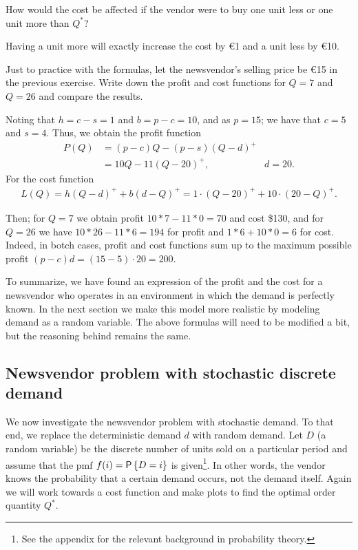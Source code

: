 \begin{exercise}
How would the cost be affected if the vendor were to buy one unit less or one unit more than $Q^*$?
\begin{solution}
Having a unit more will exactly increase the cost by €1 and a unit less by €10. 
\end{solution}
\end{exercise}

\begin{exercise} Just to practice with the formulas, 
let the newsvendor's selling price be €15 in the previous exercise. Write down the profit and cost functions for $Q=7$ and $Q=26$ and compare the results.
\begin{solution}
Noting that $h=c-s=1$ and $b=p-c=10$, and as $p=15$; we have that $c=5$ and $s=4$. Thus, we obtain the profit function
\begin{align*}
P(Q) 
&= (p-c)Q - (p-s)(Q-d)^+ \\
&= 10 Q - 11 (Q-20)^+, & d=20.
\end{align*}
For the cost function
\begin{align*}
L(Q) = h(Q-d)^+ + b(d-Q)^+ = 1\cdot (Q-20)^+ + 10\cdot(20-Q)^+.
\end{align*}

Then; for $Q=7$ we obtain profit $10*7 - 11*0 =70$ and cost \$130, and for $Q=26$ we have $10*26-11*6 = 194$ for profit and $1*6 + 10*0 = 6$ for cost. Indeed, in botch cases, profit and cost functions sum up to the maximum possible profit $(p-c)d=(15-5)\cdot 20=200$.
\end{solution}
\end{exercise}

To summarize, we have found an expression of the profit and the cost for a newsvendor who operates in an environment in which the demand is perfectly known. In the next section we make this model more realistic by modeling demand as a random variable. The above formulas will need to be modified a bit, but the reasoning behind remains the same. 

\subsection{Newsvendor problem with stochastic discrete demand}
\label{sec:stoch-discr-demand}

We now investigate the newsvendor problem with stochastic demand. To that end, we replace the deterministic demand $d$ with  random demand. Let $D$ (a random variable)
be the discrete number of units sold on a particular period and assume that
the pmf  $f(i) = \P{ D = i}$ is given\footnote{See the appendix for the relevant background in probability theory.}. In other words, the vendor knows the probability that a certain demand occurs, not the demand itself.  Again we will work towards a cost function and make plots to find the optimal order quantity $Q^*$. 


